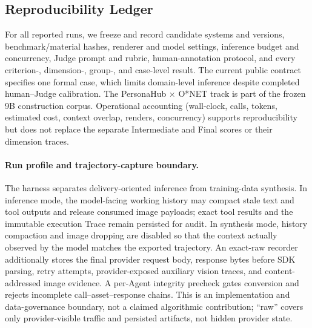 \subsection{Reproducibility Ledger}

For all reported runs, we freeze and record candidate systems and versions, benchmark/material hashes, renderer and model settings, inference budget and concurrency, Judge prompt and rubric, human-annotation protocol, and every criterion-, dimension-, group-, and case-level result. The current public contract specifies one formal case, which limits domain-level inference despite completed human--Judge calibration. The PersonaHub \(\times\) O*NET track is part of the frozen 9B construction corpus. Operational accounting (wall-clock, calls, tokens, estimated cost, context overlap, renders, concurrency) supports reproducibility but does not replace the separate Intermediate and Final scores or their dimension traces.

\paragraph{Run profile and trajectory-capture boundary.} The harness separates delivery-oriented inference from training-data synthesis. In inference mode, the model-facing working history may compact stale text and tool outputs and release consumed image payloads; exact tool results and the immutable execution Trace remain persisted for audit. In synthesis mode, history compaction and image dropping are disabled so that the context actually observed by the model matches the exported trajectory. An exact-raw recorder additionally stores the final provider request body, response bytes before SDK parsing, retry attempts, provider-exposed auxiliary vision traces, and content-addressed image evidence. A per-Agent integrity precheck gates conversion and rejects incomplete call--asset--response chains. This is an implementation and data-governance boundary, not a claimed algorithmic contribution; ``raw'' covers only provider-visible traffic and persisted artifacts, not hidden provider state.
